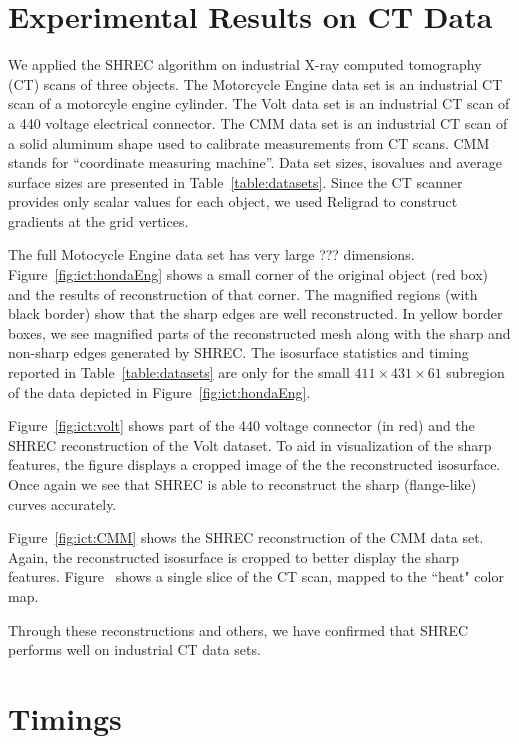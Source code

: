 \section{Experimental Results on CT Data}

We applied the SHREC algorithm on industrial X-ray computed tomography (CT)
scans of three objects.
The Motorcycle Engine data set is an industrial CT scan 
of a motorcyle engine cylinder.
The Volt data set is an industrial CT scan 
of a 440 voltage electrical connector.
The CMM data set 
is an industrial CT scan of a solid aluminum shape
used to calibrate measurements from CT scans.
CMM stands for ``coordinate measuring machine''.
Data set sizes, isovalues and average surface sizes are presented
in Table~\ref{table:datasets}.
Since the CT scanner provides only scalar values for each object,
we used Religrad to construct gradients at the grid vertices.

The full Motocycle Engine data set has very large ??? dimensions.
Figure~\ref{fig:ict:hondaEng} shows a small corner of the original object
(red box)
and the results of reconstruction of that corner.
The magnified regions (with black border) show that the sharp edges
are well reconstructed. In yellow border boxes, we see magnified parts
of the reconstructed mesh along with the sharp and non-sharp edges
generated by SHREC.
The isosurface statistics and timing reported in Table~\ref{table:datasets}
are only for the small $411 \times 431 \times 61$ subregion of the data
depicted in Figure~\ref{fig:ict:hondaEng}.

Figure~\ref{fig:ict:volt} shows part of the 440 voltage connector (in red)
and the SHREC reconstruction of the Volt dataset.
To aid in visualization of the sharp features,
the figure displays a cropped image of the the reconstructed isosurface.
Once again we see that SHREC is able to reconstruct 
the sharp (flange-like) curves accurately.

Figure~\ref{fig:ict:CMM} shows the SHREC reconstruction of the CMM data set.
Again, the reconstructed isosurface is cropped to better
display the sharp features.
Figure~\protect{} shows a single slice of
the CT scan, mapped to the ``heat" color map.

Through these reconstructions and others,
we have confirmed that SHREC performs well on industrial CT data sets. 

\section{Timings}


